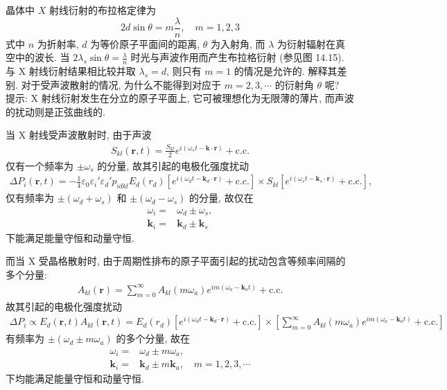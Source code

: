 \documentclass{note}
\begin{document}
\begin{exe}
    晶体中 $X$ 射线衍射的布拉格定律为
    \[
        2d\sin\theta=m\frac{\lambda}{n},\quad m=1,2,3
    \]
    式中 $n$ 为折射率, $d$ 为等价原子平面间的距离, $\theta$ 为入射角, 而 $\lambda$ 为衍射辐射在真空中的波长. 当 $2\lambda_s\sin\theta=\frac{\lambda}{n}$ 时光与声波作用而产生布拉格衍射 (参见图 14.15). 与 X 射线衍射结果相比较并取 $\lambda_s=d$, 则只有 $m=1$ 的情况是允许的. 解释其差别. 对于受声波散射的情况, 为什么不能得到对应于 $m=2,3,\cdots$ 的衍射角 $\theta$ 呢?\\
    提示: X 射线衍射发生在分立的原子平面上, 它可被理想化为无限薄的薄片, 而声波的扰动则是正弦曲线的.
\end{exe}
\begin{sol}
    当 X 射线受声波散射时, 由于声波
    \begin{align}
        S_{kl}(\bm{r},t)=\frac{S_{kl}}{2}e^{i(\omega_st-\bm{k}\cdot\bm{r})}+\text{c.c.}
    \end{align}
    仅有一个频率为 $\pm\omega_s$ 的分量, 故其引起的电极化强度扰动
    \begin{align}
        \Delta P_i(\bm{r},t)=-\frac{1}{4}\varepsilon_0\varepsilon_i'\varepsilon_d'p_{idkl}E_d(r_d)[e^{i(\omega_dt-\bm{k}_d\cdot\bm{r})}+\text{c.c.}]\times S_{kl}[e^{i(\omega_st-\bm{k}_s\cdot\bm{r})}+\text{c.c.}],
    \end{align}
    仅有频率为 $\pm(\omega_d+\omega_s)$ 和 $\pm(\omega_d-\omega_s)$ 的分量, 故仅在
    \begin{align}
        \omega_i=&\omega_d\pm\omega_s,\\
        \bm{k}_i=&\bm{k}_d\pm\bm{k}_s
    \end{align}
    下能满足能量守恒和动量守恒.

    而当 X 受晶格散射时, 由于周期性排布的原子平面引起的扰动包含等频率间隔的多个分量:
    \begin{align}
        A_{kl}(\bm{r})=\sum_{m=0}^{\infty}A_{kl}(m\omega_a)e^{im(\omega_a-\bm{k}_at)}+\text{c.c.}
    \end{align}
    故其引起的电极化强度扰动
    \begin{align}
        \Delta P_i\propto E_d(\bm{r},t)A_{kl}(\bm{r},t)=E_d(r_d)[e^{i(\omega_dt-\bm{k}_d\cdot\bm{r})}+\text{c.c.}]\times\left[\sum_{m=0}^{\infty}A_{kl}(m\omega_a)e^{im(\omega_a-\bm{k}_at)}+\text{c.c.}\right]
    \end{align}
    有频率为 $\pm(\omega_d\pm m\omega_a)$ 的多个分量, 故在
    \begin{align}
        \omega_i=&\omega_d\pm m\omega_a,\\
        \bm{k}_i=&\bm{k}_d\pm m\bm{k}_a,\quad m=1,2,3,\cdots
    \end{align}
    下均能满足能量守恒和动量守恒.
\end{sol}
\end{document}
